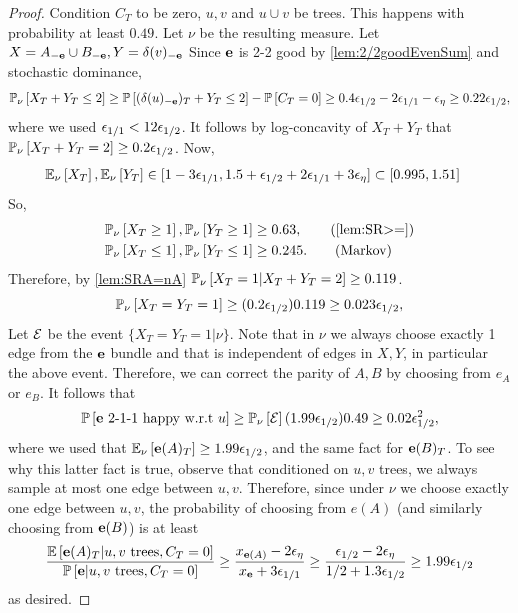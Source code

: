 \lemeABpositivetwooneone*
\begin{proof}
Condition $C_T$ to be zero, $u,v$ and $u\cup v$ be trees. This happens with probability at least  $0.49$.
Let $\nu$ be the resulting measure.
Let $X=A_{-{\bf e}}\cup B_{-{\bf e}}, Y=\delta(v)_{-{\bf e}}$ 
Since ${\bf e}$ is 2-2 good by \cref{lem:2/2goodEvenSum} and stochastic dominance, 
$${\mathbb{P}}_{\nu}\left[X_T + Y_T\leq 2\right]\geq {\mathbb{P}}\left[(\delta(u)_{-{\bf e}})_T+Y_T\leq 2\right] - {\mathbb{P}}\left[C_T=0\right] \geq 0.4{\epsilon}_{1/2} - 2{\epsilon}_{1/1}-{\epsilon}_\eta\geq 0.22{\epsilon}_{1/2},$$
where we used ${\epsilon}_{1/1}<12{\epsilon}_{1/2}$.
It follows by log-concavity of $X_T+Y_T$ that ${\mathbb{P}}_{\nu}\left[X_T+Y_T=2\right]\geq 0.2{\epsilon}_{1/2}$. 
Now, 
\begin{align*}
&{\mathbb{E}}_{\nu}\left[X_T\right], {\mathbb{E}}_{\nu}\left[Y_T\right]\in [1-3{\epsilon}_{1/1}, 1.5+{\epsilon}_{1/2}+2{\epsilon}_{1/1}+3{\epsilon}_{\eta}]\subset [0.995,1.51]
\end{align*}
So,
\begin{align*}
&\PP{\nu}{X_T\geq 1}, \PP{\nu}{Y_T\geq 1}\geq 0.63, \tag{\cref{lem:SR>=}} \\
&\PP{\nu}{X_T\leq 1}, \PP{\nu}{Y_T\leq 1}\geq 0.245.\tag{Markov}
\end{align*}
Therefore, by \cref{lem:SRA=nA} ${\mathbb{P}}_{\nu}\left[X_T= 1 | X_T+Y_T=2\right]\geq 0.119$.
$$ {\mathbb{P}}_{\nu}\left[X_T=Y_T=1\right] \geq (0.2{\epsilon}_{1/2}) 0.119 \geq 0.023{\epsilon}_{1/2},$$
Let ${\cal E}$ be the event $\{X_T=Y_T=1 | \nu\}$.
Note that in $\nu$ we always choose exactly 1 edge from the ${\bf e}$ bundle and that is independent of edges in $X,Y$, in particular the above event. Therefore, we can  correct the parity of $A,B$ by choosing from $e_A$ or $e_B$.
It follows that
$$ {\mathbb{P}}\left[{\bf e} \text{ 2-1-1 happy w.r.t $u$}\right] \geq {\mathbb{P}}_{\nu}\left[{\cal E}\right](1.99{\epsilon}_{1/2}) 0.49 \geq 0.02{\epsilon}_{1/2}^2,$$
where we used that ${\mathbb{E}}_{\nu}\left[{\bf e}(A)_T\right]  \geq 1.99{\epsilon}_{1/2}$, and the same fact for ${\bf e}(B)_T$. To see why this latter fact is true, observe that conditioned on $u,v$ trees, we always sample at most one edge between $u,v$. Therefore, since under $\nu$ we choose exactly one edge between $u,v$, the probability of choosing from $e(A)$ (and similarly choosing from ${\bf e}(B)$) is at least 
$$\frac{{\mathbb{E}}\left[{\bf e}(A)_T | u,v\text{ trees}, C_T=0\right]}{{\mathbb{P}}\left[{\bf e} | u,v\text{ trees}, C_T=0\right]} \geq \frac{x_{{\bf e}(A)}-2{\epsilon}_\eta}{x_{{\bf e}}+3{\epsilon}_{1/1}}\geq \frac{{\epsilon}_{1/2}-2{\epsilon}_{\eta}}{1/2+1.3{\epsilon}_{1/2}}\geq 1.99{\epsilon}_{1/2}$$
as desired.
\end{proof}




